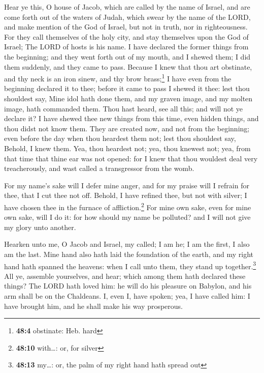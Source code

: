  Hear ye this, O house of Jacob, which are called by the
name of Israel, and are come forth out of the waters of Judah, which
swear by the name of the LORD, and make mention of the God of Israel,
but not in truth, nor in righteousness.  For they call
themselves of the holy city, and stay themselves upon the God of Israel;
The LORD of hosts is his name.  I have declared the former
things from the beginning; and they went forth out of my mouth, and I
shewed them; I did them suddenly, and they came to pass. 
Because I knew that thou art obstinate, and thy neck is an iron sinew,
and thy brow brass;\footnote{\textbf{48:4} obstinate: Heb. hard}
 I have even from the beginning declared it to thee;
before it came to pass I shewed it thee: lest thou shouldest say, Mine
idol hath done them, and my graven image, and my molten image, hath
commanded them.  Thou hast heard, see all this; and will
not ye declare it? I have shewed thee new things from this time, even
hidden things, and thou didst not know them.  They are
created now, and not from the beginning; even before the day when thou
heardest them not; lest thou shouldest say, Behold, I knew them.
 Yea, thou heardest not; yea, thou knewest not; yea, from
that time that thine ear was not opened: for I knew that thou wouldest
deal very treacherously, and wast called a transgressor from the womb.

 For my name's sake will I defer mine anger, and for my
praise will I refrain for thee, that I cut thee not off. 
Behold, I have refined thee, but not with silver; I have chosen thee in
the furnace of affliction.\footnote{\textbf{48:10} with\ldots: or, for
  silver}  For mine own sake, even for mine own sake,
will I do it: for how should my name be polluted? and I will not give my
glory unto another.

 Hearken unto me, O Jacob and Israel, my called; I am he;
I am the first, I also am the last.  Mine hand also hath
laid the foundation of the earth, and my right hand hath spanned the
heavens: when I call unto them, they stand up together.\footnote{\textbf{48:13}
  my\ldots: or, the palm of my right hand hath spread out}
 All ye, assemble yourselves, and hear; which among them
hath declared these things? The LORD hath loved him: he will do his
pleasure on Babylon, and his arm shall be on the Chaldeans.
 I, even I, have spoken; yea, I have called him: I have
brought him, and he shall make his way prosperous.


